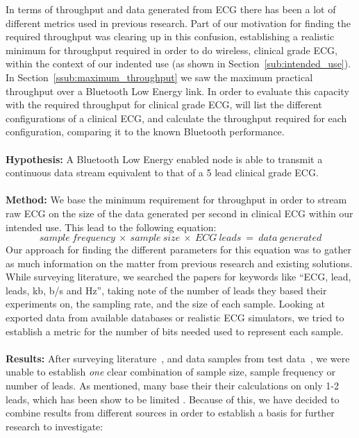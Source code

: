 In terms of throughput and data generated from ECG there has been a lot of different metrics used in previous research. Part of our motivation for finding the required throughput was clearing up in this confusion, establishing a realistic minimum for throughput required in order to do wireless, clinical grade ECG, within the context of our indented use (as shown in Section~\ref{sub:intended_use}). In Section~\ref{ssub:maximum_throughput} we saw the maximum practical throughput over a Bluetooth Low Energy link. In order to evaluate this capacity with the required throughput for clinical grade ECG, will list the different configurations of a clinical ECG, and calculate the throughput required for each configuration, comparing it to the known Bluetooth performance.
\\
\\
\noindent
\textbf{Hypothesis:} A Bluetooth Low Energy enabled node is able to transmit a continuous data stream equivalent to that of a 5 lead clinical grade ECG.
\\
\\
\noindent
\textbf{Method:} We base the minimum requirement for throughput in order to stream raw ECG on the size of the data generated per second in clinical ECG within our intended use. This lead to the following equation:
\[
  sample\:frequency\:\times\:sample\:size\:\times\:ECG\:leads\:=\:data\:generated
\]
\noindent
Our approach for finding the different parameters for this equation was to gather as much information on the matter from previous research and existing solutions. While surveying literature, we searched the papers for keywords like ``ECG, lead, leads, kb, b/s and Hz'', taking note of the number of leads they based their experiments on, the sampling rate, and the size of each sample. Looking at exported data from available databases or realistic ECG simulators, we tried to establish a metric for the number of bits needed used to represent each sample.
\\
\\
\noindent
\textbf{Results:} After surveying literature~\cite{Rijnbeek:2001vu, DimitriosJVergados:2006vy, Touati:2015gy, Anonymous:mAm40AQ3, jenniferporcello:2015wv, Ullah:2010ci, Anonymous:1SQ78ejy, ChulsungPark:2006tf, Anonymous:FtVb5yQr, yubin:2012tr, Alesanco:2010kc, Wehr:2006ht, BenElhadj:2016ic, Movassaghi:2014hi}, and data samples from test data~\cite{newRef:56:2, Physi12:online}, we were unable to establish \emph{one} clear combination of sample size, sample frequency or number of leads. As mentioned, many base their their calculations on only 1-2 leads, which has been show to be limited \cite{Drew:1998wp}. Because of this, we have decided to combine results from different sources in order to establish a basis for further research to investigate:

